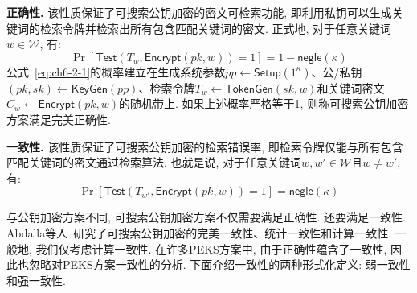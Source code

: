 \begin{trivlist}
\item \textbf{正确性.} 该性质保证了可搜索公钥加密的密文可检索功能, 即利用私钥可以生成关键词的检索令牌并检索出所有包含匹配关键词的密文. 正式地, 对于任意关键词$w \in \mathcal{W}$, 有:
\begin{equation}\label{eq:ch6-2-1}
\Pr[\mathsf{Test}(T_w, \mathsf{Encrypt}(pk, w)) = 1] = 1 - \mathsf{negle}(\kappa)
\end{equation}
公式~\ref{eq:ch6-2-1}的概率建立在生成系统参数$pp \leftarrow \mathsf{Setup}(1^\kappa)$、公/私钥$(pk, sk) \leftarrow \mathsf{KeyGen}(pp)$、检索令牌$T_w \leftarrow \mathsf{TokenGen}(sk, w)$和关键词密文$C_w \leftarrow \mathsf{Encrypt}(pk, w)$的随机带上. 如果上述概率严格等于1, 则称可搜索公钥加密方案满足完美正确性.

\item \textbf{一致性.} 该性质保证了可搜索公钥加密的检索错误率, 即检索令牌仅能与所有包含匹配关键词的密文通过检索算法. 也就是说, 对于任意关键词$w, w'  \in \mathcal{W}$且$w \neq w'$, 有:
\begin{equation}\label{eq:ch6-2-2}
\Pr[\mathsf{Test}(T_{w'}, \mathsf{Encrypt}(pk, w)) = 1] = \mathsf{negle}(\kappa)
\end{equation}
\end{trivlist}
与公钥加密方案不同, 可搜索公钥加密方案不仅需要满足正确性. 还要满足一致性. Abdalla等人~\cite{AbdallaBCKKLMNPS08}研究了可搜索公钥加密的完美一致性、统计一致性和计算一致性. 一般地, 我们仅考虑计算一致性. 在许多PEKS方案中, 由于正确性蕴含了一致性, 因此也忽略对PEKS方案一致性的分析. 下面介绍一致性的两种形式化定义: 弱一致性和强一致性.
